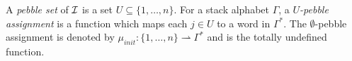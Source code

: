 \fi



A {\em pebble set} of $\mathcal{I}$ is a set $U \subseteq \{ 1, \ldots, n\}$. For a stack alphabet $\Gamma$, a 
{\em $U \!$-pebble assignment} is a function which maps each $j \in U$ to a word in $ \Gamma^*$.
The $\emptyset$-pebble assignment is denoted by $\mu_{init} :  \{ 1, \ldots, n\} \rightharpoonup  \Gamma^* $ and is the 
totally undefined function.

